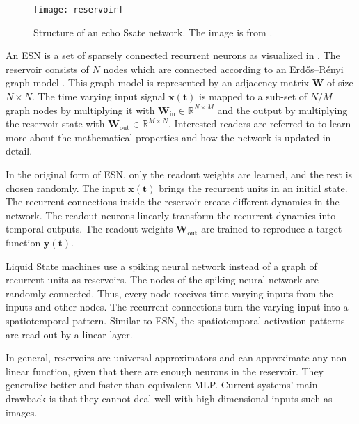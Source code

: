 \begin{figure}[h]
    \centering
    \texttt{[image: reservoir]}
    \caption[Structure of an echo state network]{Structure of an echo Ssate network. The image is from .}
\end{figure}

An ESN is a set of sparsely connected recurrent neurons as visualized in .
The reservoir consists of \(N\) nodes which are connected according to an Erdős–Rényi graph model .
This graph model is represented by an adjacency matrix \(\boldsymbol{W}\) of size \(N \times N\).
The time varying input signal \(\boldsymbol{x(t)}\) is mapped to a sub-set of \(N/M\) graph nodes by multiplying it with \(\boldsymbol{W}_{\text{in}} \in \mathbb{R}^{N\times M}\) and the output by multiplying the reservoir state with \(\boldsymbol{W}_{\text{out}} \in \mathbb{R}^{M\times N}\).
Interested readers are referred to  to learn more about the mathematical properties and how the network is updated in detail.

In the original form of ESN, only the readout weights are learned, and the rest is chosen randomly.
The input \(\boldsymbol{x(t)}\) brings the recurrent units in an initial state.
The recurrent connections inside the reservoir create different dynamics in the network.
The readout neurons linearly transform the recurrent dynamics into temporal outputs.
The readout weights \(\boldsymbol{W}_{\text{out}}\) are trained to reproduce a target function \(\boldsymbol{y(t)}\).

Liquid State machines use a spiking neural network instead of a graph of recurrent units as reservoirs.
The nodes of the spiking neural network are randomly connected.
Thus, every node receives time-varying inputs from the inputs and other nodes.
The recurrent connections turn the varying input into a spatiotemporal pattern.
Similar to ESN, the spatiotemporal activation patterns are read out by a linear layer.

In general, reservoirs are universal approximators and can approximate any non-linear function, given that there are enough neurons in the reservoir.
They generalize better and faster than equivalent MLP.
Current systems' main drawback is that they cannot deal well with high-dimensional inputs such as images.





